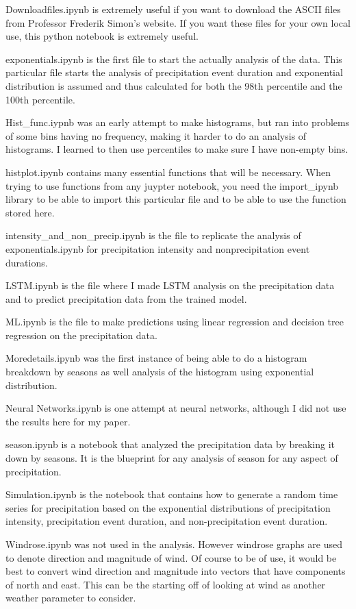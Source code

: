 \documentclass[11pt]{report}
\begin{document}
	Downloadfiles.ipynb is extremely useful if you want to download the ASCII files from Professor Frederik Simon's website. If you want these files for your own local use, this python notebook is extremely useful. 
	
	exponentials.ipynb is the first file to start the actually analysis of the data. This particular file starts the analysis of precipitation event duration and exponential distribution is assumed and thus calculated for both the 98th percentile and the 100th percentile. 
	
	Hist\_func.iypnb was an early attempt to make histograms, but ran into problems of some bins having no frequency, making it harder to do an analysis of histograms. I learned to then use percentiles to make sure I have non-empty bins.
	
	histplot.ipynb contains many essential functions that will be necessary. When trying to use functions from any juypter notebook, you need the import\_ipynb library to be able to import this particular file and to be able to use the function stored here. 
	
	intensity\_and\_non\_precip.ipynb is the file to replicate the analysis of exponentials.ipynb for precipitation intensity and nonprecipitation event durations. 
	
	LSTM.ipynb is the file where I made LSTM analysis on the precipitation data and to predict precipitation data from the trained model. 
	
	ML.ipynb is the file to make predictions using linear regression and decision tree regression on the precipitation data. 
	
	Moredetails.ipynb was the first instance of being able to do a histogram breakdown by seasons as well analysis of the histogram using exponential distribution. 
	
	Neural Networks.ipynb is one attempt at neural networks, although I did not use the results here for my paper. 
	
	season.ipynb is a notebook that analyzed the precipitation data by breaking it down by seasons. It is the blueprint for any analysis of season for any aspect of precipitation. 
	
	Simulation.ipynb is the notebook that contains how to generate a random time series for precipitation based on the exponential distributions of precipitation intensity, precipitation event duration, and non-precipitation event duration. 
	
	Windrose.ipynb was not used in the analysis. However windrose graphs are used to denote direction and magnitude of wind. Of course to be of use, it would be best to convert wind direction and magnitude into vectors that have components of north and east. This can be the starting off of looking at wind as another weather parameter to consider. 
	
\end{document}
